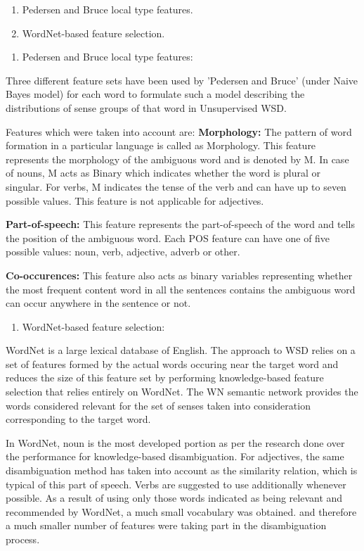 \begin{enumerate}
	\item Pedersen and Bruce local type features.
	\item WordNet-based feature selection.
\end{enumerate}

\begin{enumerate}
	\item Pedersen and Bruce local type features:
\end{enumerate}
Three different feature sets have been used by 'Pedersen and Bruce' (under Naive Bayes model) for each word to formulate such 
a model describing the distributions of sense groups of that word in Unsupervised WSD.

Features which were taken into account are:
\textbf{Morphology:} The pattern of word formation in a particular language is called as Morphology.
This feature represents the morphology \cite{5494927} of the ambiguous word and is denoted by M. 
In case of nouns, M acts as Binary which indicates whether the word is plural or singular.
For verbs, M indicates the tense of the verb and can have up to seven possible values.
This feature is not applicable for adjectives.

\textbf{Part-of-speech:} This feature represents the part-of-speech \cite{6982457} of the word and tells the position of the ambiguous word.
Each POS feature can have one of five possible values: noun, verb, adjective, adverb or other.

\textbf{Co-occurences:} This feature also acts as binary variables representing whether the most frequent content word in all the sentences contains the ambiguous word can occur anywhere in the sentence or not.

\begin{enumerate}
	\item WordNet-based feature selection:
\end{enumerate}
WordNet is a large lexical database of English. 
The approach to WSD relies on a set of features formed by the actual words occuring near the target word and 
reduces the size of this feature set by performing knowledge-based feature selection that relies entirely on WordNet.
The WN semantic network provides the words considered relevant for the set of senses taken into consideration corresponding 
to the target word.

In WordNet, noun is the most developed portion as per the research done over the performance for knowledge-based disambiguation.
For adjectives, the same disambiguation method has taken into account as the similarity relation, which  is typical of this 
part of speech.
Verbs are suggested to use additionally whenever possible.
As a result of using only those words indicated as being relevant and recommended by WordNet, a much small vocabulary was obtained.
and therefore a much smaller number of features were taking part in the disambiguation process.

